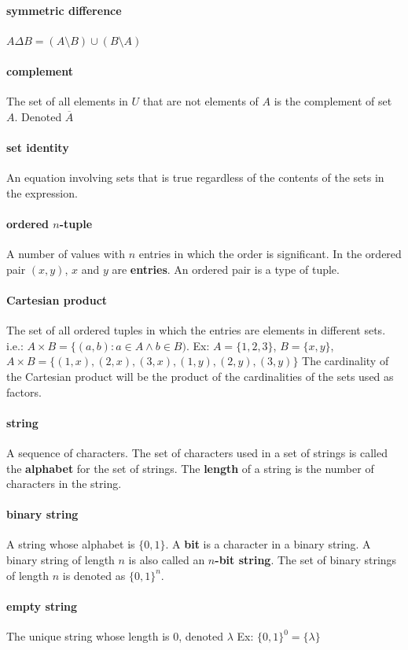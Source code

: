 \documentclass[a4paper]{article}
\begin{document}
\paragraph{symmetric difference} $A \Delta B = (A \setminus B) \cup (B \setminus A)$
\paragraph{complement} The set of all elements in $U$ that are not elements of $A$ is the complement of set $A$. Denoted $\overline{A}$

\paragraph{set identity} An equation involving sets that is true regardless of the contents of the sets in the expression.
\paragraph{ordered $n$-tuple} A number of values with $n$ entries in which the order is significant. In the ordered pair $(x,y)$, $x$ and $y$ are \textbf{entries}. An ordered pair is a type of tuple.
\paragraph{Cartesian product} The set of all ordered tuples in which the entries are elements in different sets. i.e.: $A \times B = \{ (a,b) : a \in A \land b \in B)$. Ex: $A = \{1, 2, 3\}$, $B = \{x, y\}$, $A \times B = \{(1, x),(2, x),(3, x),(1, y), (2, y), (3, y)\}$ The cardinality of the Cartesian product will be the product of the cardinalities of the sets used as factors.
\paragraph{string} A sequence of characters. The set of characters used in a set of strings is called the \textbf{alphabet} for the set of strings. The \textbf{length} of a string is the number of characters in the string. 
\paragraph{binary string} A string whose alphabet is $\{0, 1\}$. A \textbf{bit} is a character in a binary string.  A binary string of length $n$ is also called an \textbf{$n$-bit string}. The set of binary strings of length $n$ is denoted as $\{0,1\}^n$.
\paragraph{empty string} The unique string whose length is 0, denoted $\lambda$ Ex: $\{0, 1\}^0 = \{\lambda\}$
\end{document}
